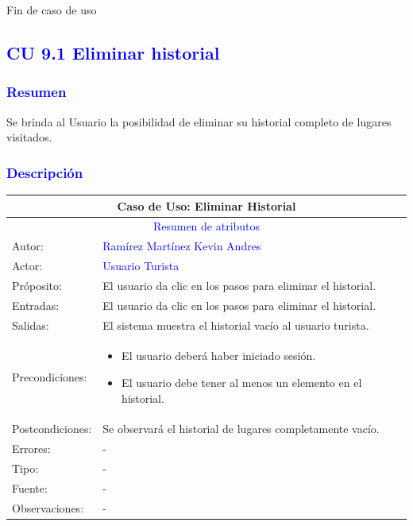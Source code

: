 \newpage
Fin de caso de uso



\pagebreak
\subsection{\textcolor{blue}{CU 9.1 Eliminar historial}}

\subsubsection{\textcolor{blue}{Resumen}}
Se brinda al Usuario la posibilidad de eliminar su historial completo de lugares visitados.
\subsubsection{\textcolor{blue}{Descripción}}
\begin{tabularx}{16cm}{||l|X||}
	\hline
	\multicolumn{2}{||c||}{Caso de Uso: Eliminar Historial} \\
	\hline
	\multicolumn{2}{||c||}{\textcolor{blue}{Resumen de atributos}} \\
 \hline
	{Autor:} & {\textcolor{blue}{Ramírez Martínez Kevin Andres}} \\
	\hline
	\hline
	{Actor:} & {\textcolor{blue}{Usuario Turista}} \\
	\hline
	{Próposito:} & El usuario da clic en los pasos para eliminar el historial.\\
	\hline
	{Entradas:} & El usuario da clic en los pasos para eliminar el historial.
        \\
	\hline
	{Salidas:} & El sistema muestra el historial vacío al usuario turista.\\
	\hline
	{Precondiciones:} & 
        \begin{itemize}
            \item El usuario deberá haber iniciado sesión.
            \item El usuario debe tener al menos un elemento en el historial.
        \end{itemize}\\ 
	\hline
	{Postcondiciones:} & Se observará el historial de lugares completamente vacío.\\
	\hline
	{Errores:} & {-} \\
	\hline
	{Tipo:} & {-}\\
	\hline
	{Fuente:} & {-} \\
	\hline
	{Observaciones:} & {-} \\
	\hline
\end{tabularx}

